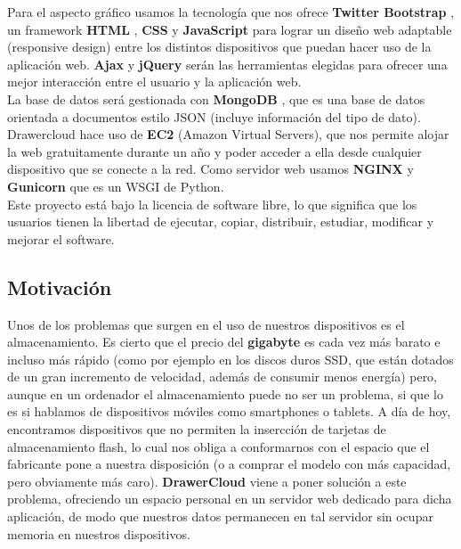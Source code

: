 Para el aspecto gráfico usamos la tecnología que nos ofrece \textbf{Twitter Bootstrap} \cite{cita3}, un framework \textbf{HTML} \cite{cita4}, \textbf{CSS} \cite{cita5} y \textbf{JavaScript} \cite{cita6} para lograr un diseño web adaptable (responsive design) entre los distintos dispositivos que puedan hacer uso de la aplicación web. \textbf{Ajax} \cite{cita7} y \textbf{jQuery} \cite{cita8} serán las herramientas elegidas para ofrecer una mejor interacción entre el usuario y la aplicación web. \\

La base de datos será gestionada con \textbf{MongoDB} \cite{cita9}, que es una base de datos orientada a documentos estilo JSON (incluye información del tipo de dato). \\

Drawercloud hace uso de \textbf{EC2} \cite{cita_ec2} (Amazon Virtual Servers), que nos permite alojar la web gratuitamente durante un año y poder acceder a ella desde cualquier dispositivo que se conecte a la red. Como servidor web usamos \textbf{NGINX} \cite{cita_nginx} y \textbf{Gunicorn} \cite{cita_gunicorn} que es un WSGI de Python.\\

Este proyecto está bajo la licencia de software libre, lo que significa que los usuarios tienen la libertad de ejecutar, copiar, distribuir, estudiar, modificar y mejorar el software.

\subsection{Motivación}

Unos de los problemas que surgen en el uso de nuestros dispositivos es el almacenamiento. Es cierto que el precio del \textbf{gigabyte} es cada vez más barato e incluso más rápido (como por ejemplo en los discos duros SSD, que están dotados de un gran incremento de velocidad, además de consumir menos energía) pero, aunque en un ordenador el almacenamiento puede no ser un problema, si que lo es si hablamos de dispositivos móviles como smartphones o tablets. A día de hoy, encontramos dispositivos que no permiten la insercción de tarjetas de almacenamiento flash, lo cual nos obliga a conformarnos con el espacio que el fabricante pone a nuestra disposición (o a comprar el modelo con más capacidad, pero obviamente más caro). \textbf{DrawerCloud} viene a poner solución a este problema, ofreciendo un espacio personal en un servidor web dedicado para dicha aplicación, de modo que nuestros datos permanecen en tal servidor sin ocupar memoria en nuestros dispositivos. \\

